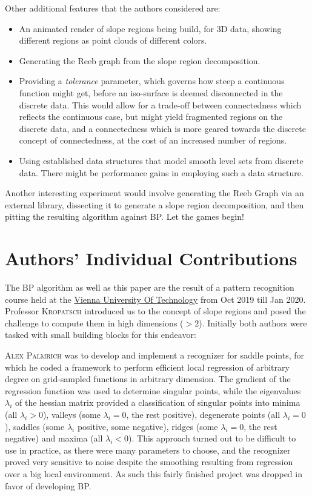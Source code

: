 \documentclass[a4paper,12pt,notitlepage,fullpage]{paper}
\theoremstyle{plain}
\theoremstyle{definition}
\begin{document}
Other additional features that the authors considered are:
\begin{itemize}
\item An animated render of slope regions being build, for 3D data, showing different regions as point clouds of different colors.
\item Generating the Reeb graph from the slope region decomposition.
\item Providing a \emph{tolerance} parameter, which governs how steep a continuous function might get, before an iso-surface is deemed disconnected in the discrete data. This would allow for a trade-off between connectedness which reflects the continuous case, but might yield fragmented regions on the discrete data, and a connectedness which is more geared towards the discrete concept of connectedness, at the cost of an increased number of regions.
\item Using established data structures that model smooth level sets from discrete data. There might be performance gains in employing such a data structure.
\end{itemize}

Another interesting experiment would involve generating the Reeb Graph via an external library, dissecting it to generate a slope region decomposition, and then pitting the resulting algorithm against BP. Let the games begin!

\section{Authors' Individual Contributions}
The BP algorithm as well as this paper are the result of a pattern recognition course held at the \href{https://www.tuwien.at/en/}{Vienna University Of Technology} from Oct 2019 till Jan 2020. Professor \textsc{Kropatsch} introduced us to the concept of slope regions and posed the challenge to compute them in high dimensions ($>2$). Initially both authors were tasked with small building blocks for this endeavor:

\textsc{Alex Palmrich} was to develop and implement a recognizer for saddle points, for which he coded a framework to perform efficient local regression of arbitrary degree on grid-sampled functions in arbitrary dimension. The gradient of the regression function was used to determine singular points, while the eigenvalues $\lambda_i$ of the hessian matrix provided a classification of singular points into minima (all $\lambda_i>0$), valleys (some $\lambda_i=0$, the rest positive), degenerate points (all $\lambda_i=0$), saddles (some $\lambda_i$ positive, some negative), ridges (some $\lambda_i=0$, the rest negative) and maxima (all $\lambda_i<0$). This approach turned out to be difficult to use in practice, as there were many parameters to choose, and the recognizer proved very sensitive to noise despite the smoothing resulting from regression over a big local environment. As such this fairly finished project was dropped in favor of developing BP.
\end{document}
